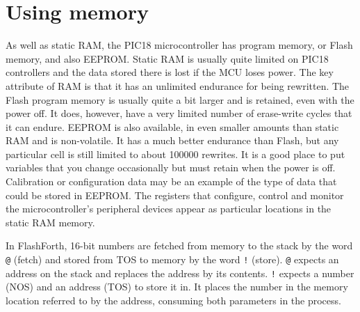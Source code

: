 \documentclass[12pt,a4paper]{article}
\begin{document}
\bigskip
\section{Using memory}
\label{sec:memory}
%
As well as static RAM, the PIC18 microcontroller has program memory, or Flash memory,
and also EEPROM.
Static RAM is usually quite limited on PIC18 controllers and the data stored there is
lost if the MCU loses power.
The key attribute of RAM is that it has an unlimited endurance for being rewritten.
The Flash program memory is usually quite a bit larger and is retained, even with the power off.
It does, however, have a very limited number of erase-write cycles that it can endure.
EEPROM is also available, in even smaller amounts than static RAM and is non-volatile.
It has a much better endurance than Flash, but any particular cell 
is still limited to about 100000 rewrites.
It is a good place to put variables that you change occasionally but must retain when the power is off.
Calibration or configuration data may be an example of the type of data 
that could be stored in EEPROM.
The registers that configure, control and monitor the microcontroller's peripheral devices 
appear as particular locations in the static RAM memory.

\medskip
In FlashForth, 16-bit numbers are fetched from memory to the stack by the word \verb!@! (fetch)
and stored from TOS to memory by the word \verb?!? (store).
\verb?@? expects an address on the stack and replaces the address by its contents.
\verb?!? expects a number (NOS) and an address (TOS) to store it in.
It places the number in the memory location referred to by the address, 
consuming both parameters in the process.
\end{document}
